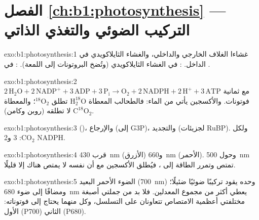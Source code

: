 \section*{الفصل \ref{ch:b1:photosynthesis} --- التركيب الضوئي والتغذي الذاتي}

\begin{solution}{exo:b1:photosynthesis:1}
غشاءا الغلاف الخارجي والداخلي، والغشاء الثايلاكويدي في الداخل.
: في الغشاء الثايلاكويدي (وتُضخ البروتونات إلى
اللمعة). : في .
\end{solution}

\begin{solution}{exo:b1:photosynthesis:2}
$2\,\mathrm{H_2O} + 2\,\mathrm{NADP^+} + 3\,\mathrm{ADP} + 3\,\mathrm{P_i}
\to \mathrm{O_2} + 2\,\mathrm{NADPH} + 2\,\mathrm{H^+} + 3\,\mathrm{ATP}$
مع ثمانية فوتونات. والأكسجين يأتي من الماء: فالطحالب المعطاة
$\mathrm{H_2^{18}O}$ تطلق $\mathrm{^{18}O_2}$؛ والمعطاة
$\mathrm{C^{18}O_2}$ لا تطلقه (روبن وكامن).
\end{solution}

\begin{solution}{exo:b1:photosynthesis:3}
 ()، والإرجاع (إلى G3P)، والتجديد (لجزيئات RuBP). ولكل
$\mathrm{CO_2}$: 3  و2 NADPH.
\end{solution}

\begin{solution}{exo:b1:photosynthesis:4}
قرب \qty{430}{nm} (الأزرق) و\qty{660}{nm} (الأحمر). وحول
\qty{500}{nm} تمتص  وتمرر الطاقة إلى ، فيُطلق
الأكسجين مع أن  نفسه لا يمتص هناك إلا قليلًا.
\end{solution}

\begin{solution}{exo:b1:photosynthesis:5}
الضوء الأحمر البعيد (\qty{700}{nm}) وحده يقود تركيبًا ضوئيًا ضئيلًا؛
ومضافًا إلى ضوء \qty{680}{nm} يعطي أكثر من مجموع المعدلين. فلا بد من
جملتي أصبغة مختلفتي أعظمية الامتصاص تتعاونان على التسلسل، وكل منهما
يحتاج إلى فوتوناته:  الأول (P700)  الثاني
(P680).
\end{solution}

